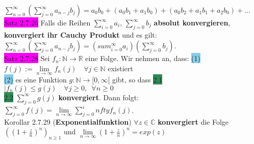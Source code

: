 \documentclass[10pt]{article}
\begin{document}
        \indent \textcolor{NavyBlue}{$\sum_{n=0}^\infty(\sum_{j=0}^\infty a_{n-j}b_j)
                =a_0b_0+(a_0b_1+a_1b_0)+(a_0b_2+a_1b_1+a_2b_0)+...$}\\
\colorbox{magenta}{Satz 2.7.26} Falls die Reihen 
                \textcolor{NavyBlue}{$\sum_{i=0}^\infty a_i,\,\sum_{j=0}^\infty b_j$}
                \textbf{absolut konvergieren}, 
                \textbf{konvergiert ihr Cauchy Produkt} und es gilt: \\
        \indent \textcolor{NavyBlue}{$\sum_{n=0}^\infty(\sum_{j=0}^\infty a_{n-j}b_j)
                =(sum_{i=0}^\infty a_i)(\sum_{j=0}^\infty b_j)$}.\\
\colorbox{magenta}{Satz 2.7.28} Sei 
                \textcolor{NavyBlue}{$f_n:\mathbb{N}\longrightarrow\mathbb{R}$} eine Folge. 
                Wir nehmen an, dass: 
                \colorbox{SkyBlue}{(1)} 
                \textcolor{NavyBlue}{
                $f(j):=\lim\limits_{n\to\infty}f_n(j)\quad\forall j\in\mathbb{N}$} 
                existiert \\
        \indent \colorbox{SkyBlue}{(2)} es eine Funktion 
                \textcolor{NavyBlue}{$g:\mathbb{N}\longrightarrow[0,\infty[$} gibt,
                so dass \colorbox{SeaGreen}{2.1} 
                \textcolor{NavyBlue}{$|f_n(j)\leqslant g(j)\quad\forall j\geqslant0,\enspace
                \forall n\geqslant0$} \\
        \indent \colorbox{SeaGreen}{2.2} \textcolor{NavyBlue}{$\sum_{j=0}^\infty g(j)$} 
                \textbf{konvergiert}. Dann folgt: 
                \textcolor{NavyBlue}{
                $\sum_{j=0}^\infty f(j)=\lim\limits_{n\to\infty}\sum_{j=0}^infty f_n(j)$}.\\
\colorbox{BurntOrange}{Korollar 2.7.29} (\textbf{Exponentialfunktion})
                \textcolor{NavyBlue}{$\forall z\in\mathbb{C}$} \textbf{konvergiert} die Folge 
                \textcolor{NavyBlue}{$((1+\frac{z}{n})^n)_{n\geqslant1}$} und 
                \textcolor{NavyBlue}{$\lim\limits_{n\to\infty}(1+\frac{z}{n})^n=exp(z)$}
\end{document}
